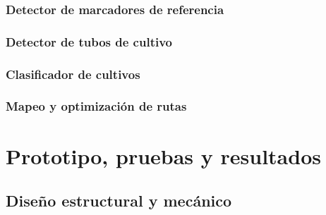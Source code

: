 \documentclass[a4paper,12pt]{report}
\begin{document}
\subsection{Detector de marcadores de referencia}





\subsection{Detector de tubos de cultivo}




\subsection{Clasificador de cultivos}



\subsection{Mapeo y optimización de rutas}



%
%
%
%

\chapter{Prototipo, pruebas y resultados}
\section{Diseño estructural y mecánico}





\end{document}
